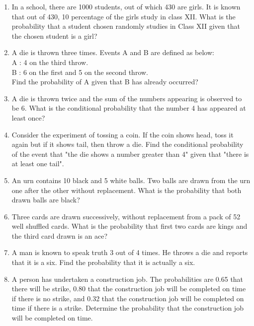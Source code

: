 \begin{enumerate}[label=\thesection.\arabic*.,ref=\thesection.\theenumi]
\item In a school, there are 1000 students, out of which 430 are girls. It is known that out of 430,  10 percentage of the girls study in class XII. What is the probability that a student chosen randomly studies in Class XII given that the chosen student is a girl?\\
\solution


\item A die is thrown three times. Events A and B are defined as below:\\
A : 4 on the third throw.\\
B : 6 on the first and 5 on the second throw.\\
Find the probability of A given that B has already occurred?\\
\solution


\item A die is thrown twice and the sum of the numbers appearing is observed to be 6. What is the conditional probability that the number 4 has appeared at least once?\\
\solution


\item Consider the experiment of tossing a coin. If the coin shows head, toss it again but if it shows tail, then throw a die. Find the conditional probability of the event that "the die shows a number greater than 4" given that "there is at least one tail".\\
\solution


\item An urn contains 10 black and 5 white balls. Two balls are drawn from the urn one after the other without replacement. What is the probability that both drawn balls are black?\\

\item Three cards are drawn successively, without replacement from a pack of 52 well shuffled cards. What is the probability that first two cards are kings and the third card drawn is an ace?\\

\item A man is known to speak truth 3 out of 4 times. He throws a die and reports that it is a six. Find the probability that it is actually a six.\\

\item A person has undertaken a construction job. The probabilities are 0.65 that there will be strike, 0.80 that the construction job will be completed on time if there is no strike, and 0.32 that the construction job will be completed on time if there is a strike. Determine the probability that the construction job will be completed on time.\\
\solution



\end{enumerate}
